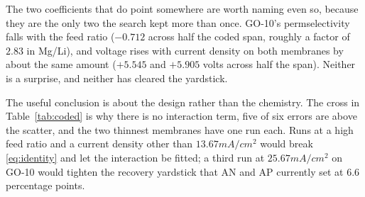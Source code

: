 The two coefficients that do point somewhere are worth naming even so, because they are the only
two the search kept more than once. GO-10's permselectivity falls with the feed ratio
($-0.712$ across half the coded span, roughly a factor of $2.83$ in Mg/Li), and voltage rises
with current density on both membranes by about the same amount ($+5.545$ and $+5.905$ volts
across half the span). Neither is a surprise, and neither has cleared the yardstick.

The useful conclusion is about the design rather than the chemistry. The cross in
Table~\ref{tab:coded} is why there is no interaction term, five of six errors are above the
scatter, and the two thinnest membranes have one run each. Runs at a high feed ratio and a
current density other than $13.67\unit{mA/cm^2}$ would break \eqref{eq:identity} and let the
interaction be fitted; a third run at $25.67\unit{mA/cm^2}$ on GO-10 would tighten the recovery
yardstick that AN and AP currently set at $6.6$ percentage points.
